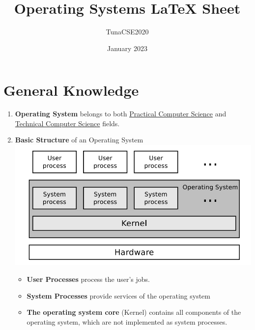 \documentclass{article}
\title{Operating Systems \LaTeX{} Sheet}
\author{TunaCSE2020}
\date{January 2023}
\begin{document}
	\pagestyle{fancy}
	\fancyhead{}\fancyfoot{}
	

\maketitle

\section{General Knowledge}
    \begin{enumerate}
        \item \textbf{Operating System} belongs to both \underline{Practical Computer Science} and \underline{Technical Computer Science} fields.

        \item \textbf{Basic Structure} of an Operating System \\
        \includegraphics[width=.7\textwidth]{img/osStructure.png}
        
        \begin{itemize}
            \item \textbf{User Processes} process the user's jobs.
            \item \textbf{System Processes} provide services of the operating system
            \item \textbf{The operating system core} (Kernel) contains all components of the operating system, which are not implemented as system processes.
            
        \end{itemize}


\end{enumerate}
\end{document}
